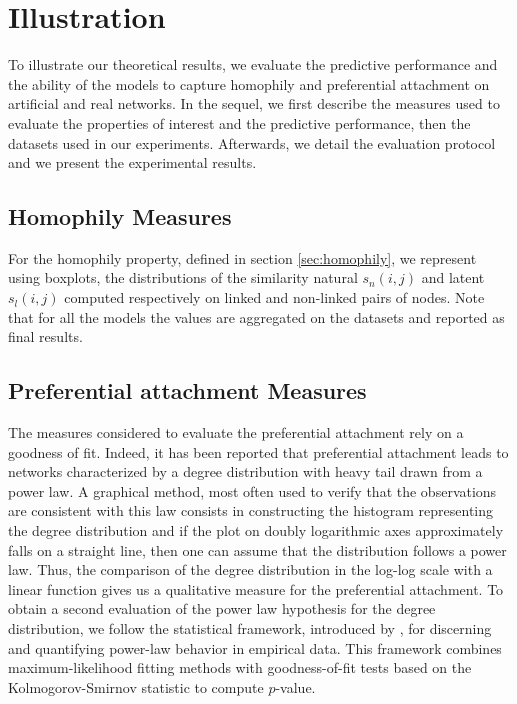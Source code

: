\section{Illustration}

To illustrate our theoretical results, we evaluate the predictive performance and the ability of the models to capture homophily and preferential attachment on artificial and real networks. In the sequel, we first describe the measures used to evaluate the properties of interest and the predictive performance, then the datasets used in our experiments. Afterwards, we detail the evaluation protocol and we present the experimental results.

\subsection{Homophily Measures}

For the homophily property, defined in section \ref{sec:homophily}, we represent using boxplots, the distributions of the similarity natural $s_n(i,j)$ and latent $s_l(i,j)$ computed respectively on linked and non-linked pairs of nodes. Note that for all the models the values are aggregated on the datasets and reported as final results.


\subsection{Preferential attachment Measures}
\label{sec:experiments-burst}

The measures considered to evaluate the preferential attachment rely on a goodness of fit. Indeed, it has been reported that preferential attachment leads to networks characterized by a degree distribution with heavy tail drawn from a power law. A graphical method, most often used to verify that the observations are consistent with this law  consists in constructing the histogram representing the degree distribution and if the plot on doubly logarithmic axes approximately falls on a straight line, then one can assume that the distribution follows a power law. Thus, the comparison of the degree distribution in the log-log scale with a linear function gives us a qualitative measure for the preferential attachment. To obtain a second evaluation of the power law hypothesis for the degree distribution, we follow the statistical framework, introduced by \cite{clauset2009power}, for discerning and quantifying power-law behavior in empirical data. This framework combines maximum-likelihood fitting methods with goodness-of-fit tests based on the Kolmogorov-Smirnov statistic to compute $p$-value.


